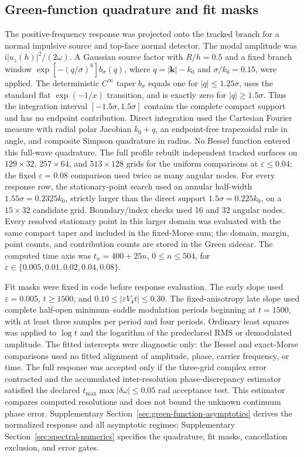 \subsection{Green-function quadrature and fit masks}

The positive-frequency response was projected onto the tracked branch for a
normal impulsive source and top-face normal detector.  The modal amplitude
was \(\mathrm i|u_z(h)|^2/(2\omega)\).  A Gaussian source factor with
\(R/h=0.5\) and a fixed branch window
\(\exp[-(q/\sigma)^8]b_\sigma(q)\), where \(q=|\boldsymbol k|-k_0\) and
\(\sigma/k_0=0.15\), were applied.  The deterministic \(C^\infty\) taper
\(b_\sigma\) equals one for \(|q|\leq1.25\sigma\), uses the standard flat
\(\exp(-1/x)\) transition, and is exactly zero for
\(|q|\geq1.5\sigma\).  Thus the integration interval
\([-1.5\sigma,1.5\sigma]\) contains the complete compact support and has no
endpoint contribution.  Direct integration used the Cartesian
Fourier measure with radial polar Jacobian \(k_0+q\), an endpoint-free
trapezoidal rule in angle, and composite
Simpson quadrature in radius.  No Bessel function entered this full-wave
quadrature.  The full profile rebuilt independent tracked surfaces on
\(129\times32\), \(257\times64\), and \(513\times128\) grids for the uniform
comparisons at \(\varepsilon\leq0.04\); the fixed \(\varepsilon=0.08\)
comparison used twice as many angular nodes.
For every response row, the stationary-point search used an annular half-width
\(1.55\sigma=0.2325k_0\), strictly larger than the direct support
\(1.5\sigma=0.225k_0\), on a \(15\times32\) candidate grid.  Boundary/index
checks used 16 and 32 angular nodes.  Every resolved stationary point in this
larger domain was evaluated with the same compact taper and included in the
fixed-Morse sum; the domain, margin, point counts, and contribution counts are
stored in the Green sidecar.
The computed time axis was \(t_n=400+25n\), \(0\leq n\leq504\), for
\(\varepsilon\in\{0.005,0.01,0.02,0.04,0.08\}\).

Fit masks were fixed in code before response evaluation.  The early slope
used \(\varepsilon=0.005\), \(t\geq1500\), and
\(0.10\leq|\varepsilon V_4t|\leq0.30\).  The fixed-anisotropy late slope used
complete half-open minimum--saddle modulation periods beginning at \(t=1500\),
with at least three samples per period and four periods.  Ordinary least
squares was applied to \(\log t\) and the logarithm of the predeclared RMS or
demodulated amplitude.  The fitted intercepts were diagnostic only: the Bessel and
exact-Morse comparisons used no fitted alignment of amplitude, phase, carrier
frequency, or time.  The full response was accepted only if the three-grid
complex error contracted and the accumulated inter-resolution
phase-discrepancy estimator satisfied the declared
\(t_{\max}\max|\delta\omega|\leq0.05\) rad acceptance test.  This estimator
compares computed resolutions and does not bound the unknown continuum phase
error.  Supplementary
Section~\ref{sec:green-function-asymptotics} derives the normalized response
and all asymptotic regimes; Supplementary Section~\ref{sec:spectral-numerics}
specifies the quadrature, fit masks, cancellation exclusion, and error gates.

